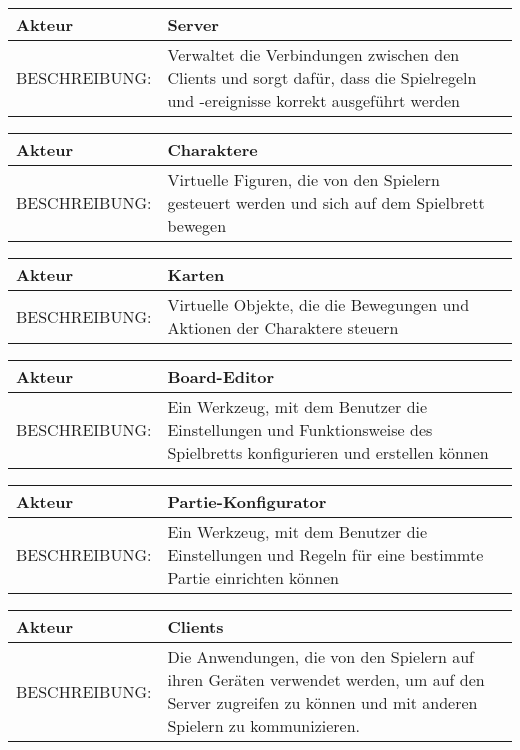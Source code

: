 \documentclass{uulm-assignment}
\begin{document}
	\begin{tabularx}{\textwidth}{|l|X |} \hline
	        \textbf{Akteur} & \textbf{Server} \\
	        \hline
	        BESCHREIBUNG: &  Verwaltet die Verbindungen zwischen den Clients und sorgt dafür, dass die Spielregeln und -ereignisse korrekt ausgeführt werden  \\
	        \hline
	\end{tabularx}
	    
	\begin{tabularx}{\textwidth}{|l|X |} \hline
	        \textbf{Akteur} & \textbf{Charaktere} \\
	        \hline
	        BESCHREIBUNG: &  Virtuelle Figuren, die von den Spielern gesteuert werden und sich auf dem Spielbrett bewegen  \\
	        \hline
	\end{tabularx}
	
	\begin{tabularx}{\textwidth}{|l|X |} \hline
	        \textbf{Akteur} & \textbf{Karten} \\
	        \hline
	        BESCHREIBUNG: &  Virtuelle Objekte, die die Bewegungen und Aktionen der Charaktere steuern \\
	        \hline
	\end{tabularx}
	
	\begin{tabularx}{\textwidth}{|l|X |} \hline
	        \textbf{Akteur} & \textbf{Board-Editor} \\
	        \hline
	        BESCHREIBUNG: &  Ein Werkzeug, mit dem Benutzer die Einstellungen und Funktionsweise des Spielbretts konfigurieren und erstellen können \\
	        \hline
	\end{tabularx}
	
	\begin{tabularx}{\textwidth}{|l|X |} \hline
	        \textbf{Akteur} & \textbf{Partie-Konfigurator} \\
	        \hline
	        BESCHREIBUNG: &  Ein Werkzeug, mit dem Benutzer die Einstellungen und Regeln für eine bestimmte Partie einrichten können  \\
	        \hline
	\end{tabularx}
	
	\begin{tabularx}{\textwidth}{|l|X |} \hline
	        \textbf{Akteur} & \textbf{Clients} \\
	        \hline
	        BESCHREIBUNG: & Die Anwendungen, die von den Spielern auf ihren Geräten verwendet werden, um auf den Server zugreifen zu können und mit anderen Spielern zu kommunizieren.  \\
	        \hline
	\end{tabularx}
	
\end{document}
